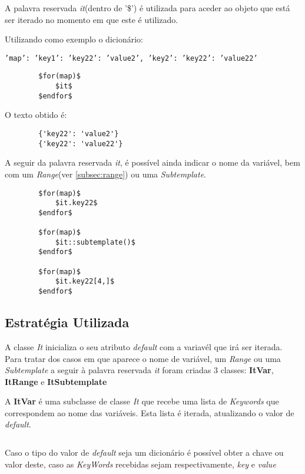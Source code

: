 \documentclass[../relatorio.tex]{subfiles}
\begin{document}
    A palavra reservada \textit{it}(dentro de '\$') é utilizada
    para aceder ao objeto que está ser iterado no momento em que
    este é utilizado.

    Utilizando como exemplo o dicionário:
    
    \texttt{'map': {'key1': {'key22': 'value2'}, 'key2': {'key22': 'value22'}}}

    \begin{verbatim}
        $for(map)$
            $it$
        $endfor$
    \end{verbatim}

    O texto obtido é:
    \begin{verbatim}
        {'key22': 'value2'}
        {'key22': 'value22'}
    \end{verbatim}

    A seguir da palavra reservada \textit{it}, é possível ainda indicar
    o nome da variável, bem com um \textit{Range}(ver \ref{subsec:range})
    ou uma \textit{Subtemplate}.

    \begin{verbatim}
        $for(map)$
            $it.key22$
        $endfor$

        $for(map)$
            $it::subtemplate()$
        $endfor$

        $for(map)$
            $it.key22[4,]$
        $endfor$
    \end{verbatim}

    \subsection{Estratégia Utilizada}

    A classe \textit{It} inicializa o seu atributo \textit{default}
    com a variavél que irá ser iterada. Para tratar dos casos em que
    aparece o nome de variável, um \textit{Range} ou uma \textit{Subtemplate}
    a seguir à palavra reservada \textit{it} foram criadas 3 classes: \textbf{ItVar}, 
    \textbf{ItRange} e \textbf{ItSubtemplate}


    A \textbf{ItVar} é uma subclasse de classe \textit{It} que recebe uma lista de \textit{Keywords}
    que correspondem ao nome das variáveis. Esta lista é iterada,
    atualizando o valor de \textit{default}. 
    
    \inputminted[firstline=11, lastline=17]{py}{../modules/It/ItVar.py}
    
    Caso o tipo do valor de \textit{default} seja um dicionário é possível obter
    a chave ou valor deste, caso as \textit{KeyWords} recebidas sejam respectivamente,
    \textit{key} e \textit{value}
\end{document}
